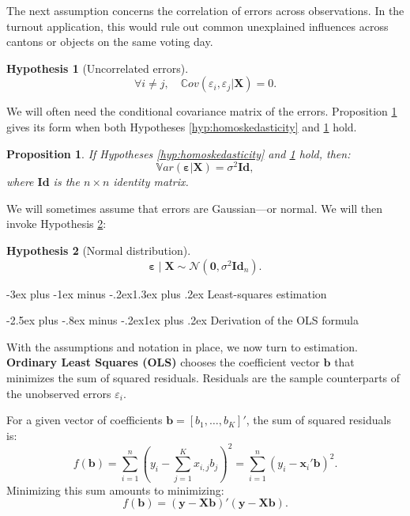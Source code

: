 \documentclass[
  11pt,
]{book}
\makeatletter
\renewcommand\section{\@startsection{section}{1}{\z@}
  {-3ex plus -1ex minus -.2ex}{1.3ex plus .2ex}
  {\normalfont\Large\bfseries\color{TextbookInk}}}
\renewcommand\subsection{\@startsection{subsection}{2}{\z@}
  {-2.5ex plus -.8ex minus -.2ex}{1ex plus .2ex}
  {\normalfont\large\bfseries\color{TextbookInk}}}
\newtheorem{proposition}{Proposition}[chapter]
\theoremstyle{definition}
\theoremstyle{definition}
\theoremstyle{definition}
\theoremstyle{definition}
\newtheorem{hypothesis}{Hypothesis}[chapter]
\theoremstyle{remark}
\makeatother
\begin{document}
The next assumption concerns the correlation of errors across observations. In the turnout application, this would rule out common unexplained influences across cantons or objects on the same voting day.

\begin{hypothesis}[Uncorrelated errors]
\protect\hypertarget{hyp:noncorrelResid}{}\label{hyp:noncorrelResid}\[
\forall i \ne j, \quad \mathbb{C}ov(\varepsilon_i,\varepsilon_j|\mathbf{X})=0.
\]
\end{hypothesis}

We will often need the conditional covariance matrix of the errors. Proposition \ref{prp:Sigma} gives its form when both Hypotheses \ref{hyp:homoskedasticity} and \ref{hyp:noncorrelResid} hold.

\begin{proposition}
\protect\hypertarget{prp:Sigma}{}\label{prp:Sigma}If Hypotheses \ref{hyp:homoskedasticity} and \ref{hyp:noncorrelResid} hold, then:
\[
\mathbb{V}ar(\boldsymbol\varepsilon|\mathbf{X})= \sigma^2 \mathbf{Id},
\]
where \(\mathbf{Id}\) is the \(n \times n\) identity matrix.
\end{proposition}

We will sometimes assume that errors are Gaussian---or normal. We will then invoke Hypothesis \ref{hyp:normality}:

\begin{hypothesis}[Normal distribution]
\protect\hypertarget{hyp:normality}{}\label{hyp:normality}\[
\boldsymbol\varepsilon\mid\mathbf{X}\sim\mathcal{N}(\mathbf{0},\sigma^2\mathbf{Id}_n).
\]
\end{hypothesis}

\section{Least-squares estimation}\label{LSquares}

\subsection{Derivation of the OLS formula}\label{derivation-of-the-ols-formula}

With the assumptions and notation in place, we now turn to estimation. \textbf{Ordinary Least Squares (OLS)} chooses the coefficient vector \(\mathbf{b}\) that minimizes the sum of squared residuals. Residuals are the sample counterparts of the unobserved errors \(\varepsilon_i\).

For a given vector of coefficients \(\mathbf{b}=[b_1,\dots,b_K]'\), the sum of squared residuals is:
\[
f(\mathbf{b}) =\sum_{i=1}^n \left(y_i - \sum_{j=1}^K x_{i,j} b_j \right)^2 = \sum_{i=1}^n (y_i - \mathbf{x}_i' \mathbf{b})^2.
\]
Minimizing this sum amounts to minimizing:
\[
f(\mathbf{b}) = (\mathbf{y} - \mathbf{X}\mathbf{b})'(\mathbf{y} - \mathbf{X}\mathbf{b}).
\]
\end{document}

